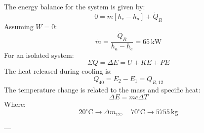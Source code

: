 The energy balance for the system is given by:  
\[
0 = \dot{m}[h_e - h_a] + \dot{Q}_R
\]  
Assuming \( W = 0 \):  
\[
\dot{m} = \frac{\dot{Q}_R}{h_a - h_e} = 65 \, \text{kW}
\]  
For an isolated system:  
\[
\Sigma Q = \Delta E = U + KE + PE
\]  
The heat released during cooling is:  
\[
Q_{40} = E_2 - E_1 = Q_{R,12}
\]  
The temperature change is related to the mass and specific heat:  
\[
\Delta E = m c \Delta T
\]  
Where:  
\[
20^\circ\text{C} \to \Delta m_{12}, \quad 70^\circ\text{C} \to 5755 \, \text{kg}
\]

---